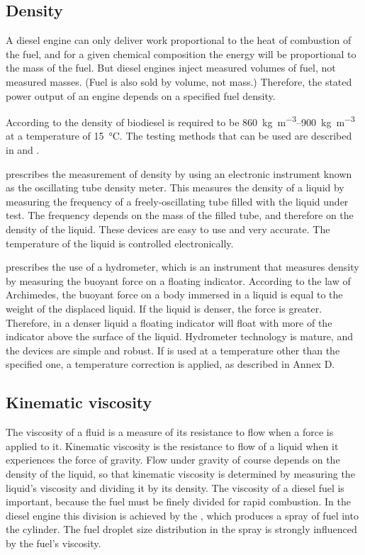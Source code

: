 \subsection{Density}

A diesel engine can only deliver work proportional to the heat of combustion of
the fuel, and for a given chemical composition the energy will be proportional
to the mass of the fuel. But diesel engines inject measured volumes of fuel, not
measured masses. (Fuel is also sold by volume, not mass.) Therefore, the stated
power output of an engine depends on a specified fuel density.

According to  the density of biodiesel is required to be
\SIrange{860}{900}{\kilogram\per\cubic\metre} at a temperature of
\SI{15}{\celsius}. The testing methods that can be used are described in
 and .


 prescribes the measurement of density by using an electronic
instrument known as the oscillating tube density meter. This measures the
density of a liquid by measuring the frequency of a freely-oscillating tube
filled with the liquid under test. The frequency depends on the mass of the
filled tube, and therefore on the density of the liquid.
These devices are easy to use and very accurate. The temperature of the liquid
is controlled electronically.

 prescribes the use of a hydrometer, which is an instrument that
measures density by measuring the buoyant force on a floating indicator.
According to the law of Archimedes, the buoyant force on a body immersed in a
liquid is equal to the weight of the displaced liquid. If the liquid is denser,
the force is greater. Therefore, in a denser liquid a floating indicator will
float with more of the indicator above the surface of the liquid. Hydrometer
technology is mature, and the devices are simple and robust.  If 
is used at a temperature other than the specified one, a temperature correction
is applied, as described in Annex D.

\subsection{Kinematic viscosity}
\label{sec:Viscosity}

The viscosity of a fluid is a measure of its resistance to flow when a force is
applied to it. Kinematic viscosity is the resistance to flow of a liquid when it
experiences the force of gravity. Flow under gravity of course depends on the
density of the liquid, so that kinematic viscosity is determined by measuring
the liquid's viscosity and dividing it by its density. The viscosity of a diesel
fuel is important, because the fuel must be finely divided for rapid combustion.
In the diesel engine this division is achieved by the , which
produces a spray of fuel into the cylinder. The fuel droplet size distribution
in the spray is strongly influenced by the fuel's viscosity.

